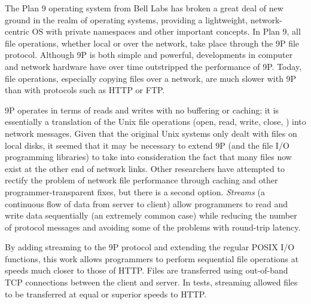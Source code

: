 \documentclass[11pt,american]{report}
\begin{document}
\begin{abstractpage}
The Plan 9 operating system from Bell Labs has broken a great deal of new ground in the realm of operating systems, providing a lightweight, network-centric OS with private namespaces and other important concepts. In Plan 9, all file operations, whether local or over the network, take place through the 9P file protocol. Although 9P is both simple and powerful, developments in computer and network hardware have over time outstripped the performance of 9P. Today, file operations, especially copying files over a network, are much slower with 9P than with protocols such as HTTP or FTP.

9P operates in terms of reads and writes with no buffering or caching; it is essentially a translation of the Unix file operations (open, read, write, close, \etc) into network messages. Given that the original Unix systems only dealt with files on local disks, it seemed that it may be necessary to extend 9P (and the file I/O programming libraries) to take into consideration the fact that many files now exist at the other end of network links. Other researchers have attempted to rectify the problem of network file performance through caching and other programmer-transparent fixes, but there is a second option. \emph{Streams} (a continuous flow of data from server to client) allow programmers to read and write data sequentially (an extremely common case) while reducing the number of protocol messages and avoiding some of the problems with round-trip latency. 

By adding streaming to the 9P protocol and extending the regular POSIX I/O functions, this work allows programmers to perform sequential file operations at speeds much closer to those of HTTP. Files are transferred using out-of-band TCP connections between the client and server. In tests, streaming allowed files to be transferred at equal or superior speeds to HTTP.
\end{abstractpage}



\afterpreface%
\end{document}
